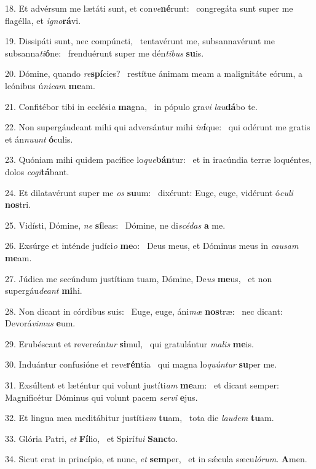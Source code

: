 18. Et advérsum me lætáti sunt, et con\textit{ve}\textbf{né}runt: \ast\  congregáta sunt super me flagélla, et \textit{i}\textit{gno}\textbf{rá}vi.\

19. Dissipáti sunt, nec compúncti, \dag\  tentavérunt me, subsannavérunt me subsanna\textit{ti}\textbf{ó}ne: \ast\  frenduérunt super me dén\textit{ti}\textit{bus} \textbf{su}is.\

20. Dómine, quando \textit{re}\textbf{spí}cies? \ast\  restítue ánimam meam a malignitáte eórum, a leónibus ú\textit{ni}\textit{cam} \textbf{me}am.\

21. Confitébor tibi in ecclési\textit{a} \textbf{ma}gna, \ast\  in pópulo gra\textit{vi} \textit{lau}\textbf{dá}bo te.\

22. Non supergáudeant mihi qui adversántur mihi \textit{in}\textbf{í}que: \ast\  qui odérunt me gratis et án\textit{nu}\textit{unt} \textbf{ó}culis.\

23. Quóniam mihi quidem pacífice lo\textit{que}\textbf{bán}tur: \ast\  et in iracúndia terræ loquéntes, dolos \textit{co}\textit{gi}\textbf{tá}bant.\

24. Et dilatavérunt super me \textit{os} \textbf{su}um: \ast\  dixérunt: Euge, euge, vidérunt ó\textit{cu}\textit{li} \textbf{nos}tri.\

25. Vidísti, Dómine, \textit{ne} \textbf{sí}leas: \ast\  Dómine, ne di\textit{scé}\textit{das} \textbf{a} me.\

26. Exsúrge et inténde judíci\textit{o} \textbf{me}o: \ast\  Deus meus, et Dóminus meus in \textit{cau}\textit{sam} \textbf{me}am.\

27. Júdica me secúndum justítiam tuam, Dómine, De\textit{us} \textbf{me}us, \ast\  et non supergáu\textit{de}\textit{ant} \textbf{mi}hi.\

28. Non dicant in córdibus suis: \dag\  Euge, euge, áni\textit{mæ} \textbf{nos}træ: \ast\  nec dicant: Devorá\textit{vi}\textit{mus} \textbf{e}um.\

29. Erubéscant et revereán\textit{tur} \textbf{si}mul, \ast\  qui gratulántur \textit{ma}\textit{lis} \textbf{me}is.\

30. Induántur confusióne et re\textit{ve}\textbf{rén}tia \ast\  qui magna lo\textit{quún}\textit{tur} \textbf{su}per me.\

31. Exsúltent et læténtur qui volunt justíti\textit{am} \textbf{me}am: \ast\  et dicant semper: Magnificétur Dóminus qui volunt pacem \textit{ser}\textit{vi} \textbf{e}jus.\

32. Et lingua mea meditábitur justíti\textit{am} \textbf{tu}am, \ast\  tota die \textit{lau}\textit{dem} \textbf{tu}am.\

33. Glória Patri, \textit{et} \textbf{Fí}lio, \ast\  et Spirí\textit{tu}\textit{i} \textbf{Sanc}to.\

34. Sicut erat in princípio, et nunc, \textit{et} \textbf{sem}per, \ast\  et in sǽcula sæcu\textit{ló}\textit{rum}. \textbf{A}men.\

